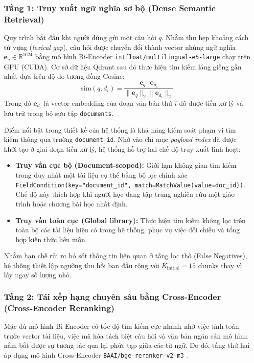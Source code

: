 ﻿\documentclass[12pt]{article}
\begin{document}
\subsubsection{Tầng 1: Truy xuất ngữ nghĩa sơ bộ (Dense Semantic Retrieval)}
Quy trình bắt đầu khi người dùng gửi một câu hỏi $q$. Nhằm thu hẹp khoảng cách từ vựng (\textit{lexical gap}), câu hỏi được chuyển đổi thành vector nhúng ngữ nghĩa $\mathbf{e}_q \in \mathbb{R}^{1024}$ bằng mô hình Bi-Encoder \texttt{intfloat/multilingual-e5-large} \cite{wang2024e5} chạy trên GPU (CUDA). Cơ sở dữ liệu Qdrant sau đó thực hiện tìm kiếm láng giềng gần nhất dựa trên độ đo tương đồng Cosine:
\begin{equation}
    \text{sim}(q, d_i) = \frac{\mathbf{e}_q \cdot \mathbf{e}_{d_i}}{\|\mathbf{e}_q\|_2 \|\mathbf{e}_{d_i}\|_2}
\end{equation}
Trong đó $\mathbf{e}_{d_i}$ là vector embedding của đoạn văn bản thứ $i$ đã được tiền xử lý và lưu trữ trong bộ sưu tập \texttt{documents}. 

Điểm nổi bật trong thiết kế của hệ thống là khả năng kiểm soát phạm vi tìm kiếm thông qua trường \texttt{document\_id}. Nhờ vào chỉ mục \textit{payload index} đã được khởi tạo ở giai đoạn tiền xử lý, hệ thống hỗ trợ hai chế độ truy xuất linh hoạt:
\begin{itemize}
    \item \textbf{Truy vấn cục bộ (Document-scoped):} Giới hạn không gian tìm kiếm trong duy nhất một tài liệu cụ thể bằng bộ lọc chính xác \texttt{FieldCondition(key="document\_id", match=MatchValue(value=doc\_id))}. Chế độ này thích hợp khi người học đang tập trung nghiên cứu một giáo trình hoặc chương bài học nhất định.
    \item \textbf{Truy vấn toàn cục (Global library):} Thực hiện tìm kiếm không lọc trên toàn bộ các tài liệu hiện có trong hệ thống, phục vụ việc đối chiếu và tổng hợp kiến thức liên môn.
\end{itemize}

Nhằm hạn chế rủi ro bỏ sót thông tin liên quan ở tầng lọc thô (False Negatives), hệ thống thiết lập ngưỡng thu hồi ban đầu rộng với $K_{\text{initial}} = 15$ chunks thay vì lấy ngay số lượng nhỏ.

\subsubsection{Tầng 2: Tái xếp hạng chuyên sâu bằng Cross-Encoder (Cross-Encoder Reranking)}
Mặc dù mô hình Bi-Encoder có tốc độ tìm kiếm cực nhanh nhờ việc tính toán trước vector tài liệu, việc mã hóa tách biệt câu hỏi và văn bản ngăn cản mô hình nắm bắt được sự tương tác qua lại phức tạp giữa các từ ngữ. Do đó, tầng thứ hai áp dụng mô hình Cross-Encoder \texttt{BAAI/bge-reranker-v2-m3} \cite{chen2024bge_m3}.
\end{document}
